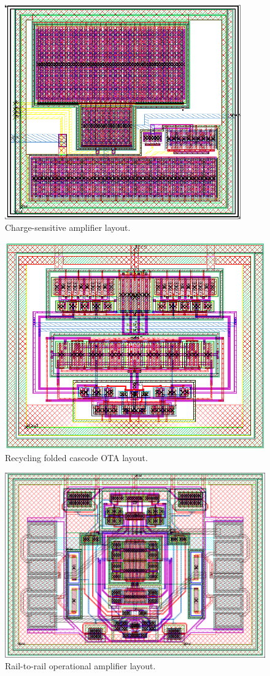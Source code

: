 \begin{figure}[!p]
	\centering
	\includegraphics[width=4in]{./Figures/CSA_layout}
	\caption{Charge-sensitive amplifier layout.}\label{fig:csa_layout}
\end{figure}

\begin{figure}[!t]
	\centering
	\includegraphics[width=4.5in]{./Figures/OTA_layout}
	\caption{Recycling folded cascode OTA layout.}\label{fig:ota_layout}
\end{figure}

\begin{figure}[!t]
	\centering
	\includegraphics[width=4.5in]{./Figures/buffer_layout}
	\caption{Rail-to-rail operational amplifier layout.}\label{fig:buffer_layout}
\end{figure}


